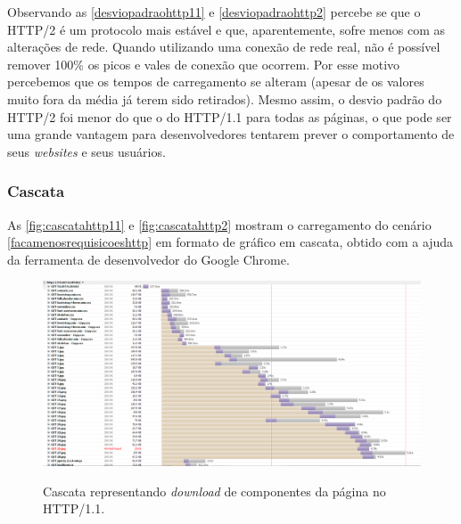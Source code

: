 



Observando as \autoref{desviopadraohttp11} e \autoref{desviopadraohttp2} percebe se que o HTTP/2 é um protocolo mais estável e que, aparentemente, sofre menos com as alterações de rede. Quando utilizando uma conexão de rede real, não é possível remover 100\% os picos e vales de conexão que ocorrem. Por esse motivo percebemos que os tempos de carregamento se alteram (apesar de os valores muito fora da média já terem sido retirados). Mesmo assim, o desvio padrão do HTTP/2 foi menor do que o do HTTP/1.1 para todas as páginas, o que pode ser uma grande vantagem para desenvolvedores tentarem prever o comportamento de seus \textit{websites} e seus usuários.

\subsubsection{Cascata}
\label{cascata}

As \autoref{fig:cascatahttp11} e \autoref{fig:cascatahttp2} mostram o carregamento do cenário \autoref{facamenosrequisicoeshttp} em formato de gráfico em cascata, obtido com a ajuda da ferramenta de desenvolvedor do Google Chrome.

\begin{figure}[!htb]
    \centering
    \caption{Cascata representando \textit{download} de componentes da página no HTTP/1.1.}
    \includegraphics[width=1.0\textwidth]{./04-figuras/analise-de-resultados/cascata_http11}
    \label{fig:cascatahttp11}
\end{figure}

